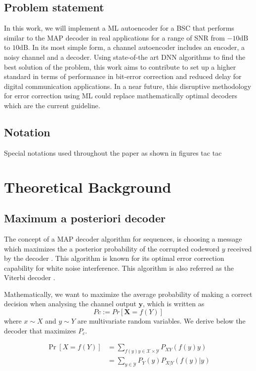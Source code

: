 \documentclass[conference]{IEEEtran}
\begin{document}
\subsection{Problem statement}

In this work, we will implement a ML autoencoder for a  BSC that performs similar to the MAP decoder in real applications for a range of SNR from $-10 \text{dB}$ to $10 \text{dB}$. In its most simple form, a channel autoencoder includes an encoder, a noisy channel and a decoder. Using state-of-the art DNN algorithms to find the best solution of the problem, this work aims to contribute to set up a higher standard in terms of performance in bit-error correction and reduced delay for digital communication applications. In a near future, this disruptive methodology for error correction using ML could replace mathematically optimal decoders which are the current guideline.


\subsection{Notation}
Special notations used throughout the paper as shown in figures tac tac


\section{Theoretical Background}


\subsection{Maximum a posteriori decoder}


The concept of a MAP decoder algorithm for sequences, is choosing a message which maximizes the a posterior probability of the corrupted codeword $y$ received by the decoder \cite{b4}. This algorithm is known for its optimal error correction capability for white noise interference. This algorithm is also referred as the Viterbi decoder \cite{viterbi}.

Mathematically, we want to maximize the average probability of making a correct decision when analysing the channel output $\textbf{y}$, which is written as
\begin{equation}\label{eq:MAP1}
Pc := Pr[\textbf{X}=f({Y})]
\end{equation}
where $x \sim X$ and $y \sim Y$ are multivariate random variables. We derive below the decoder that maximizes $P_c$.

\begin{align} 
\Pr \left[ X=f\left( Y\right) \right]& =\sum_{f\left( y\right) y\in \mathcal{X}\times \mathcal{Y}} P_{XY}(f(y)y) \label{eq:MAP2} \\
&=\sum _{y\in \mathcal{Y}}P_{Y}\left( y\right)P_{X|Y}\left( f(y)|y\right) \label{eq:MAP3}
\end{align}
\end{document}

